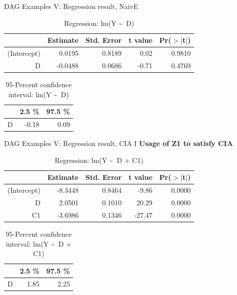 \documentclass{beamer}\usepackage[]{graphicx}\usepackage[]{xcolor}
\begin{document}
\begin{frame}[fragile]{DAG Examples V: Regression result, NaivE}
\begin{table}[ht]
\centering
\begingroup\small
\begin{tabular}{rrrrr}
  \hline
 & Estimate & Std. Error & t value & Pr($>$$|$t$|$) \\ 
  \hline
(Intercept) & 0.0195 & 0.8189 & 0.02 & 0.9810 \\ 
  D & -0.0488 & 0.0686 & -0.71 & 0.4769 \\ 
   \hline
\end{tabular}
\endgroup
\caption{Regression: lm(Y \textasciitilde ~D)} 
\end{table}
\begin{table}[ht]
\centering
\begingroup\small
\begin{tabular}{rrr}
  \hline
 & 2.5 \% & 97.5 \% \\ 
  \hline
D & -0.18 & 0.09 \\ 
   \hline
\end{tabular}
\endgroup
\caption{95-Percent confidence interval: lm(Y \textasciitilde ~D)} 
\end{table}

\end{frame}

\begin{frame}[fragile]{DAG Examples V: Regression result, CIA I}
\textbf{Usage of Z1 to satisfy CIA}
\begin{table}[ht]
\centering
\begingroup\small
\begin{tabular}{rrrrr}
  \hline
 & Estimate & Std. Error & t value & Pr($>$$|$t$|$) \\ 
  \hline
(Intercept) & -8.3448 & 0.8464 & -9.86 & 0.0000 \\ 
  D & 2.0501 & 0.1010 & 20.29 & 0.0000 \\ 
  C1 & -3.6986 & 0.1346 & -27.47 & 0.0000 \\ 
   \hline
\end{tabular}
\endgroup
\caption{Regression: lm(Y \textasciitilde ~D + C1)} 
\end{table}
\begin{table}[ht]
\centering
\begingroup\small
\begin{tabular}{rrr}
  \hline
 & 2.5 \% & 97.5 \% \\ 
  \hline
D & 1.85 & 2.25 \\ 
   \hline
\end{tabular}
\endgroup
\caption{95-Percent confidence interval: lm(Y \textasciitilde ~D + C1)} 
\end{table}

\end{frame}
\end{document}
